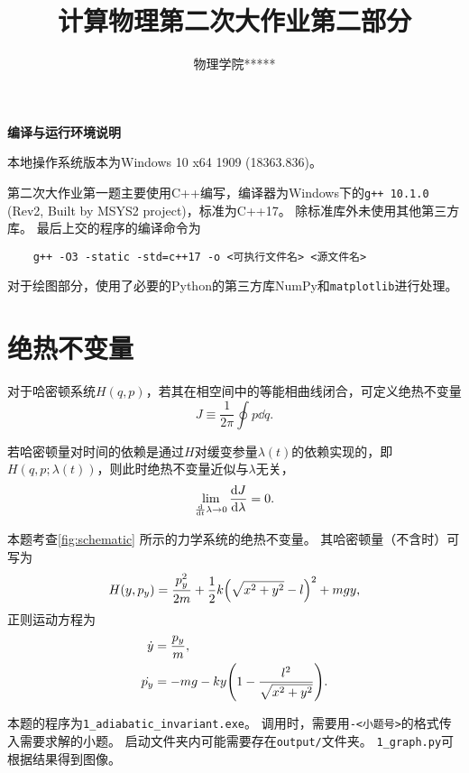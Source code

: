 \documentclass[a4paper,unicode]{report}
\title{计算物理第二次大作业第二部分}
\author{物理学院\quad ***\quad 1800011***}
\begin{document}
\maketitle
\tableofcontents

\begin{center}
    \textbf{编译与运行环境说明}
\end{center}

本地操作系统版本为\textsf{Windows 10 x64 1909 (18363.836)}。

第二次大作业第一题主要使用\textsf{C++}编写，编译器为Windows下的\texttt{g++ 10.1.0} (Rev2, Built by MSYS2 project)，标准为\textsf{C++17}。
除标准库外未使用其他第三方库。
最后上交的程序的编译命令为\begin{verbatim}
    g++ -O3 -static -std=c++17 -o <可执行文件名> <源文件名>
\end{verbatim}

对于绘图部分，使用了必要的\textsf{Python}的第三方库\textsf{NumPy}和\texttt{matplotlib}进行处理。

\chapter{绝热不变量}

对于哈密顿系统$H(q,p)$，若其在相空间中的等能相曲线闭合，可定义绝热不变量
\begin{equation}
    J\equiv \frac{1}{2\pi}\oint p\dd q.
\end{equation}

若哈密顿量对时间的依赖是通过$H$对缓变参量$\lambda(t)$的依赖实现的，即$H(q,p;\lambda(t))$，则此时绝热不变量近似与$\lambda$无关，
\begin{equation}
    \lim_{\dv{t}\lambda\to 0}\dv{J}{\lambda} = 0.
\end{equation}

本题考查\autoref{fig:schematic} 所示的力学系统的绝热不变量。
其哈密顿量（不含时）可写为
\begin{equation}
    H(y, p_y) = \frac{p_y^2}{2m} + \frac{1}{2}k\qty(\sqrt{x^2+y^2} - l)^2 + mgy,
\end{equation}
正则运动方程为
\begin{subequations}\label{eq:canonical_eq}
\begin{align}
    \dot{y} &{}= \frac{p_y}{m},\\
    \dot{p_y} &{}= -mg-ky\qty(1-\frac{l^2}{\sqrt{x^2+y^2}}).
\end{align}
\end{subequations}

本题的程序为\verb|1_adiabatic_invariant.exe|。
调用时，需要用\verb|-<小题号>|的格式传入需要求解的小题。
启动文件夹内可能需要存在\verb|output/|文件夹。
\verb|1_graph.py|可根据结果得到图像。
\end{document}
